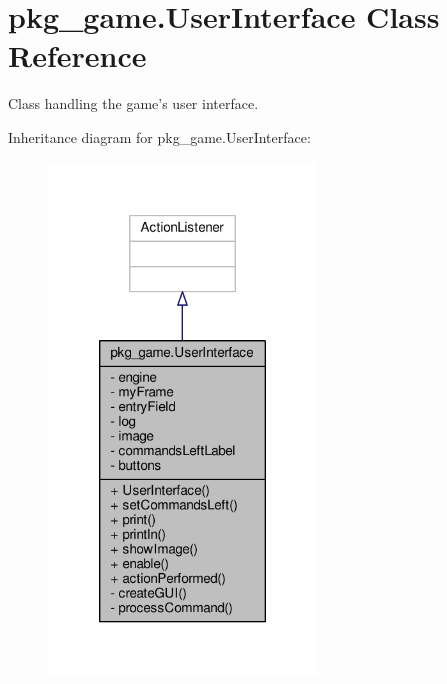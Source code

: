 \hypertarget{classpkg__game_1_1UserInterface}{\section{pkg\-\_\-game.\-User\-Interface Class Reference}
\label{classpkg__game_1_1UserInterface}
}


Class handling the game's user interface.  




Inheritance diagram for pkg\-\_\-game.\-User\-Interface\-:
\nopagebreak
\begin{figure}[H]
\begin{center}
\leavevmode
\includegraphics[width=202pt]{classpkg__game_1_1UserInterface__inherit__graph}
\end{center}
\end{figure}



